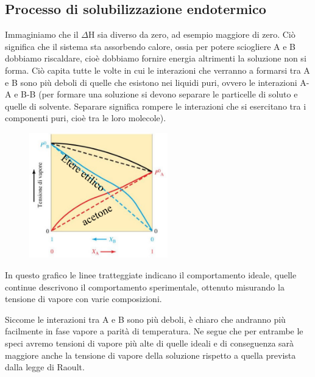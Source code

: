 \subsection{Processo di solubilizzazione endotermico}

Immaginiamo che il $\Delta$H sia diverso da zero, ad esempio maggiore di zero. Ciò significa che il sistema sta assorbendo calore, ossia per potere sciogliere A e B dobbiamo riscaldare, cioè dobbiamo fornire energia altrimenti la soluzione non si forma. Ciò capita tutte le volte in cui le interazioni che verranno a formarsi tra A e B sono più deboli di quelle che esistono nei liquidi puri, ovvero le interazioni A-A e B-B (per formare una soluzione si devono separare le particelle di soluto e quelle di solvente. Separare significa rompere le interazioni che si esercitano tra i componenti puri, cioè tra le loro molecole). 

\vspace{-0.1cm}\begin{minipage}{0.4\textwidth}
    \begin{figure}[H]
        \includegraphics[width=6cm]{immagini/tensione_di_vapore_sol_endotermica.png}
    \end{figure}
\end{minipage}
\begin{minipage}{0.6\textwidth}

\vspace{0.4cm}In questo grafico le linee tratteggiate indicano il comportamento ideale, quelle continue descrivono il comportamento sperimentale, ottenuto misurando la tensione di vapore con varie composizioni.

Siccome le interazioni tra A e B sono più deboli, è chiaro che andranno più facilmente in fase vapore a parità di temperatura. Ne segue che per entrambe le speci avremo tensioni di vapore più alte di quelle ideali e di conseguenza sarà maggiore anche la tensione di vapore della soluzione rispetto a quella prevista dalla legge di Raoult.
\end{minipage}

